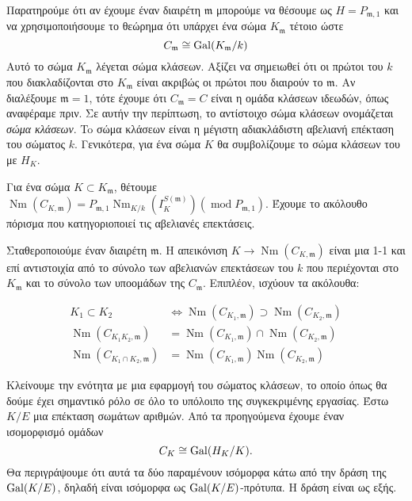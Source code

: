 \noindent Παρατηρούμε ότι αν έχουμε έναν διαιρέτη $\mathfrak{m}$ μπορούμε να θέσουμε ως $H= P_{\mathfrak{m},1}$ και να χρησιμοποιήσουμε 
το θεώρημα ότι υπάρχει ένα σώμα $K_\mathfrak{m}$ τέτοιο ώστε 
$$C_\mathfrak{m} \cong \operatorname{Gal}(K_\mathfrak{m}/k)$$ Αυτό το σώμα $K_\mathfrak{m}$ λέγεται  σώμα κλάσεων. Αξίζει να σημειωθεί 
ότι οι πρώτοι του $k$ που διακλαδίζονται στο $K_\mathfrak{m}$ είναι ακριβώς οι πρώτοι που διαιρούν το $\mathfrak{m}$. Αν διαλέξουμε 
$\mathfrak{m} =1$, τότε έχουμε ότι $C_\mathfrak{m} = C$ είναι η ομάδα κλάσεων ιδεωδών, όπως αναφέραμε πριν. Σε αυτήν την περίπτωση, 
το αντίστοιχο  σώμα κλάσεων ονομάζεται {\em {} σώμα κλάσεων}. To  σώμα κλάσεων είναι η μέγιστη αδιακλάδιστη 
αβελιανή επέκταση του σώματος $k$. Γενικότερα, για ένα σώμα $K$ θα συμβολίζουμε το  σώμα κλάσεων του με $H_K$.

Για ένα σώμα $K \subset K_\mathfrak{m}$, θέτουμε $\operatorname{Nm}(C_{K,\mathfrak{m}}) = P_{\mathfrak{m},1} \operatorname{Nm}_{K/k}(I^{S(\mathfrak{m})}_K) (\operatorname{mod}P_{\mathfrak{m},1})$. Έχουμε το ακόλουθο πόρισμα που κατηγοριοποιεί τις αβελιανές επεκτάσεις.

\begin{cor}
    Σταθεροποιούμε έναν διαιρέτη $\mathfrak{m}$. Η απεικόνιση $K \longrightarrow \operatorname{Nm}(C_{K,\mathfrak{m}})$ είναι μια 1-1 
    και επί αντιστοιχία από το σύνολο των αβελιανών επεκτάσεων του $k$ που περιέχονται στο $K_\mathfrak{m}$ και το σύνολο των 
    υποομάδων της $C_\mathfrak{m}$. Επιπλέον, ισχύουν τα ακόλουθα:
\end{cor}
\begin{align*} 
    K_1 \subset K_2 & \iff \operatorname{Nm}(C_{K_1,\mathfrak{m}}) \supset \operatorname{Nm}(C_{K_2,\mathfrak{m}}) \\
    \operatorname{Nm}(C_{K_1K_2,\mathfrak{m}}) & = \operatorname{Nm}(C_{K_1,\mathfrak{m}}) \cap \operatorname{Nm}(C_{K_2,\mathfrak{m}}) \\
    \operatorname{Nm}(C_{K_1\cap K_2,\mathfrak{m}}) &= \operatorname{Nm}(C_{K_1,\mathfrak{m}})\operatorname{Nm}(C_{K_2,\mathfrak{m}})
\end{align*}

\noindent Κλείνουμε την ενότητα με μια εφαρμογή του  σώματος κλάσεων, το οποίο όπως θα δούμε έχει σημαντικό ρόλο σε όλο το υπόλοιπο 
της συγκεκριμένης εργασίας. Έστω $K/E$ μια  επέκταση σωμάτων αριθμών. Από τα προηγούμενα έχουμε έναν ισομορφισμό ομάδων
$$C_K \cong \operatorname{Gal}(H_K/K).$$ Θα περιγράψουμε ότι αυτά τα δύο παραμένουν ισόμορφα κάτω από την δράση 
της $\operatorname{Gal}(K/E)$, δηλαδή είναι ισόμορφα ως $\operatorname{Gal}(K/E)$-πρότυπα. Η δράση είναι ως εξής.


